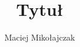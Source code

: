 \pagestyle{fancy}
\fancyhf{}
\fancyhead[R]{\MyAuthor}
\fancyhead[L]{\MyTitle}
\fancyfoot[L]{\leftmark}
\title{Tytuł}
\author{Maciej Mikołajczak}
\renewcommand{\headrulewidth}{1pt}
\renewcommand{\headruleskip}{2pt}
\setlength{\headheight}{14pt}
\renewcommand{\footrulewidth}{1pt}
\renewcommand{\arraystretch}{1.2}
\renewcommand{\thempfootnote}{\arabic{mpfootnote}}

